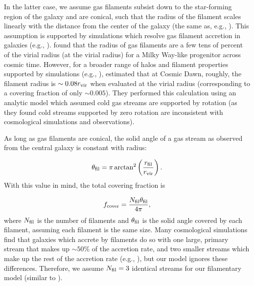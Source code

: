 \documentclass[a4paper,11pt]{article}
\begin{document}
In the latter case, we assume gas filaments subsist down to the star-forming region of the galaxy and are conical, such that the radius of the filament scales linearly with the distance from the center of the galaxy (the same as, e.g., \cite{Mandelker2018}). This assumption is supported by simulations which resolve gas filament accretion in galaxies (e.g., \cite{Dekel2009, vandeVoort2011}). \cite{Ramsoy2021} found that the radius of gas filaments are a few tens of percent of the virial radius (at the virial radius)
for a Milky Way-like progenitor across cosmic time. However, for a broader range of halos 
and filament properties supported by simulations (e.g., \cite{Danovich2012}), 
\cite{Mandelker2018} estimated that at Cosmic Dawn, roughly, the filament radius is $\sim 0.08 r_{\rm vir}$ when evaluated at the virial radius (corresponding to a covering fraction of only $\sim 0.005$). They performed this calculation using an analytic model which assumed cold gas streams are supported by rotation (as they found cold streams supported by zero rotation are inconsistent with cosmological simulations and observations). 

As long as gas filaments are conical, the solid angle of a gas stream as observed from the central galaxy is constant with radius:

\begin{equation}
    \theta_{\rm fil} = \pi \arctan^{2} \left( \frac{r_{\rm fil}}{r_{\rm vir}} \right).
\end{equation}
%
With this value in mind, the total covering fraction is

\begin{equation}
    f_{\rm cover} = \frac{N_{\rm fil} \theta_{\rm fil}}{4 \pi},
\end{equation}
%
where $N_{\rm fil}$ is the number of filaments and $\theta_{\rm fil}$ is the solid angle covered by each filament, assuming each filament is the same size. Many cosmological simulations find that galaxies which accrete by filaments do so with one large, primary stream that makes up $\sim 50 \%$ of the accretion rate, and two smaller streams which make up the rest of the accretion rate (e.g., \cite{Danovich2012}), but our model ignores these differences. Therefore, we assume $N_{\rm fil} = 3$ identical streams for our filamentary model (similar to \cite{Mandelker2018}). 
\end{document}
